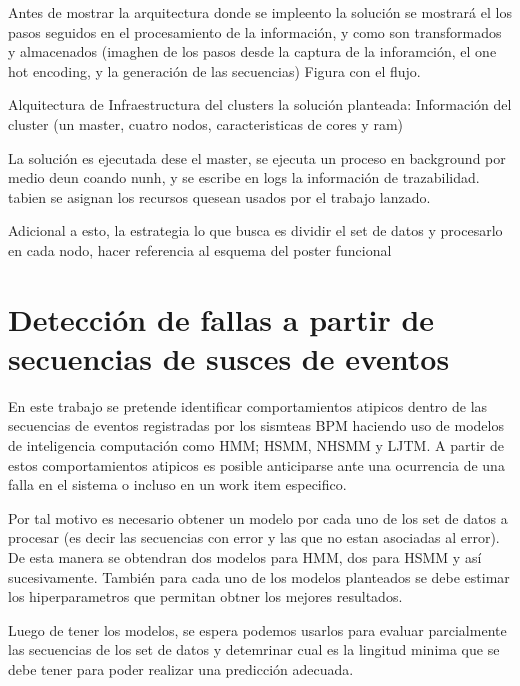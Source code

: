 Antes de mostrar la arquitectura donde se impleento la solución se mostrará el los pasos seguidos en el procesamiento de la información, y como son transformados y almacenados (imaghen de los pasos desde la captura de la inforamción, el one hot encoding, y la generación de las secuencias)
Figura con el flujo.

Alquitectura de Infraestructura del clusters la solución planteada: Información del cluster (un master, cuatro nodos, caracteristicas de cores y ram)

La solución es ejecutada dese el master, se ejecuta un proceso en background por medio deun coando nunh, y se escribe en logs la información de trazabilidad. tabien se asignan los recursos quesean usados por el trabajo lanzado. 


Adicional a esto, la estrategia lo que busca es dividir el set de datos y procesarlo en cada nodo, hacer referencia al esquema del poster funcional


\section{Detección de fallas a partir de secuencias de susces de eventos} %
\label{section2.4}

En este trabajo se pretende identificar comportamientos atipicos dentro de las secuencias de eventos registradas por los sismteas BPM haciendo uso de modelos de inteligencia computación como HMM; HSMM, NHSMM y LJTM. A partir de estos comportamientos atipicos es posible anticiparse ante una ocurrencia de una falla en el sistema o incluso en un work item especifico. 

Por tal motivo es necesario obtener un modelo por cada uno de los set de datos a procesar (es decir las secuencias con error y las que no estan asociadas al error). De esta manera se obtendran dos modelos para HMM, dos para HSMM y así sucesivamente. También para cada uno de los modelos planteados se debe estimar los hiperparametros que permitan obtner los mejores resultados. 


Luego de tener los modelos, se espera podemos usarlos para evaluar parcialmente las secuencias de los set de datos y detemrinar cual es la lingitud minima que se debe tener para poder realizar una predicción adecuada.




